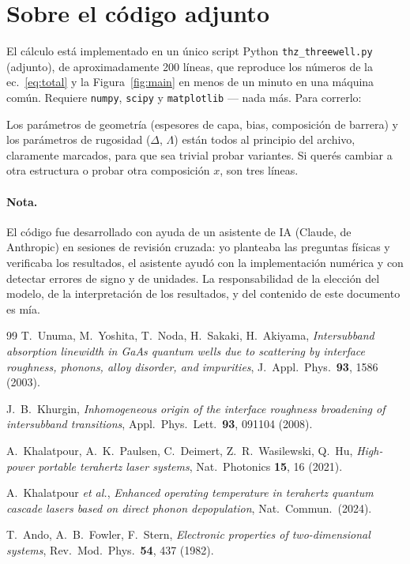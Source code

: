 \documentclass[11pt,a4paper]{article}
\begin{document}
\section{Sobre el código adjunto}

El cálculo está implementado en un único script Python \texttt{thz\_threewell.py}
(adjunto), de aproximadamente 200 líneas, que reproduce los números de la
ec.~\eqref{eq:total} y la Figura~\ref{fig:main} en menos de un minuto en
una máquina común. Requiere \texttt{numpy}, \texttt{scipy} y
\texttt{matplotlib} --- nada más. Para correrlo:

\begin{center}
\end{center}

Los parámetros de geometría (espesores de capa, bias, composición de
barrera) y los parámetros de rugosidad ($\Delta$, $\Lambda$) están todos al
principio del archivo, claramente marcados, para que sea trivial probar
variantes. Si querés cambiar a otra estructura o probar otra composición
$x$, son tres líneas.

\paragraph{Nota.} El código fue desarrollado con ayuda de un asistente de IA
(Claude, de Anthropic) en sesiones de revisión cruzada: yo planteaba las
preguntas físicas y verificaba los resultados, el asistente ayudó con la
implementación numérica y con detectar errores de signo y de unidades. La
responsabilidad de la elección del modelo, de la interpretación de los
resultados, y del contenido de este documento es mía.

\renewcommand{\refname}{Referencias}
\begin{thebibliography}{99}
T.~Unuma, M.~Yoshita, T.~Noda, H.~Sakaki, H.~Akiyama,
\emph{Intersubband absorption linewidth in GaAs quantum wells due to scattering
by interface roughness, phonons, alloy disorder, and impurities},
J.~Appl.~Phys.\ \textbf{93}, 1586 (2003).

J.~B.~Khurgin,
\emph{Inhomogeneous origin of the interface roughness broadening of
intersubband transitions},
Appl.~Phys.~Lett.\ \textbf{93}, 091104 (2008).

A.~Khalatpour, A.~K.~Paulsen, C.~Deimert, Z.~R.~Wasilewski, Q.~Hu,
\emph{High-power portable terahertz laser systems},
Nat.~Photonics \textbf{15}, 16 (2021).

A.~Khalatpour \emph{et al.},
\emph{Enhanced operating temperature in terahertz quantum cascade lasers
based on direct phonon depopulation},
Nat.~Commun.\ (2024).

T.~Ando, A.~B.~Fowler, F.~Stern,
\emph{Electronic properties of two-dimensional systems},
Rev.~Mod.~Phys.\ \textbf{54}, 437 (1982).
\end{thebibliography}
\end{document}
